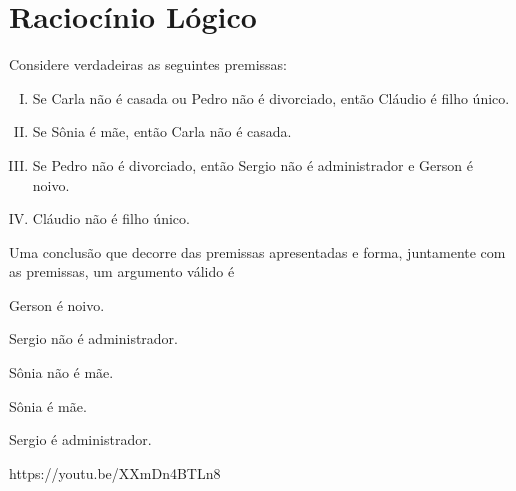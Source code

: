 \chapter{Raciocínio Lógico}


{Considere verdadeiras as seguintes premissas:
\begin{enumerate}[I.]
\item Se Carla não é casada ou Pedro não é divorciado, então Cláudio é filho único.
\item Se Sônia é mãe, então Carla não é casada.
\item Se Pedro não é divorciado, então Sergio não é administrador e Gerson é noivo.
\item Cláudio não é filho único.
\end{enumerate}
Uma conclusão que decorre das premissas apresentadas
e forma, juntamente com as premissas, um argumento
válido é
}{\item Gerson é noivo.
\item Sergio não é administrador.
\item Sônia não é mãe.
\item Sônia é mãe.
\item Sergio é administrador.}
{https://youtu.be/XXmDn4BTLn8}